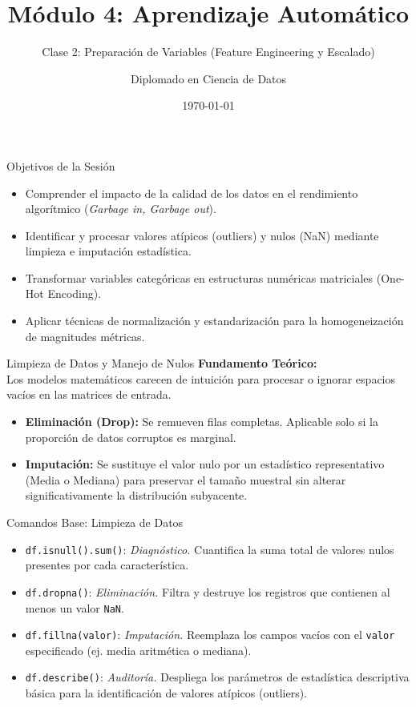 \documentclass{beamer}
\title[Preparación de Variables]{Módulo 4: Aprendizaje Automático}
\subtitle{Clase 2: Preparación de Variables (Feature Engineering y Escalado)}
\author{Diplomado en Ciencia de Datos}
\date{\today}
\begin{document}
\begin{frame}
    \titlepage
\end{frame}

\begin{frame}{Objetivos de la Sesión}
    \begin{itemize}
        \item Comprender el impacto de la calidad de los datos en el rendimiento algorítmico (\textit{Garbage in, Garbage out}).
        \item Identificar y procesar valores atípicos (outliers) y nulos (NaN) mediante limpieza e imputación estadística.
        \item Transformar variables categóricas en estructuras numéricas matriciales (One-Hot Encoding).
        \item Aplicar técnicas de normalización y estandarización para la homogeneización de magnitudes métricas.
    \end{itemize}
\end{frame}

\begin{frame}{Limpieza de Datos y Manejo de Nulos}
    \textbf{Fundamento Teórico:}
    \vspace{0.3cm}
    \\
    Los modelos matemáticos carecen de intuición para procesar o ignorar espacios vacíos en las matrices de entrada.
    \begin{itemize}
        \item \textbf{Eliminación (Drop):} Se remueven filas completas. Aplicable solo si la proporción de datos corruptos es marginal.
        \item \textbf{Imputación:} Se sustituye el valor nulo por un estadístico representativo (Media o Mediana) para preservar el tamaño muestral sin alterar significativamente la distribución subyacente.
    \end{itemize}
\end{frame}

\begin{frame}[fragile]{Comandos Base: Limpieza de Datos}
    \begin{itemize}
        \item \verb|df.isnull().sum()|: \textit{Diagnóstico.} Cuantifica la suma total de valores nulos presentes por cada característica.
        \item \verb|df.dropna()|: \textit{Eliminación.} Filtra y destruye los registros que contienen al menos un valor \verb|NaN|.
        \item \verb|df.fillna(valor)|: \textit{Imputación.} Reemplaza los campos vacíos con el \verb|valor| especificado (ej. media aritmética o mediana).
        \item \verb|df.describe()|: \textit{Auditoría.} Despliega los parámetros de estadística descriptiva básica para la identificación de valores atípicos (outliers).
    \end{itemize}
\end{frame}
\end{document}
